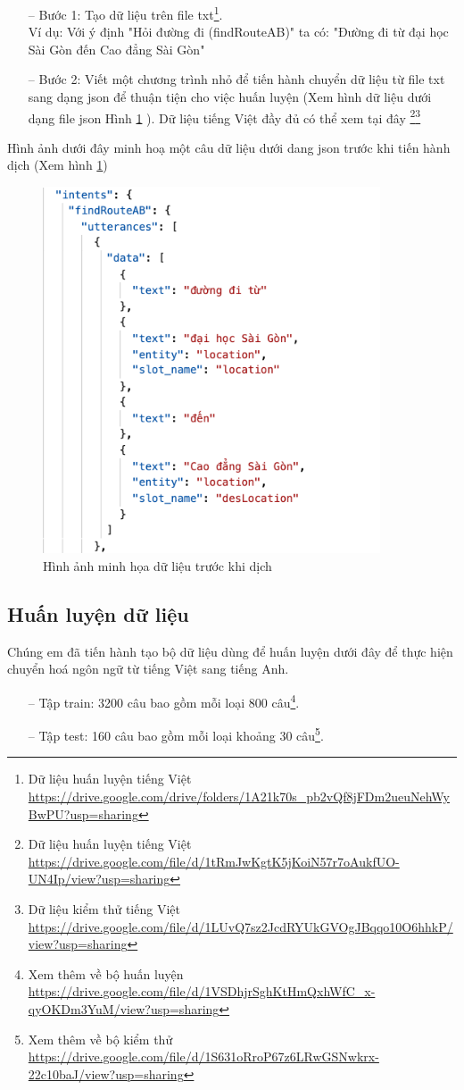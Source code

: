 \begin{itemize}
    \item[--] Bước 1: Tạo dữ liệu trên file txt\footnote{Dữ liệu huấn luyện tiếng Việt \url{https://drive.google.com/drive/folders/1A21k70s_pb2vQf8jFDm2ueuNehWyBwPU?usp=sharing}}. 
    \\Ví dụ: Với ý định "Hỏi đường đi (findRouteAB)" ta có: "Đường đi từ đại học Sài Gòn đến Cao đẳng Sài Gòn"
    \item[--] Bước 2: Viết một chương trình nhỏ để tiến hành chuyển dữ liệu từ file txt sang dạng json để thuận tiện cho việc huấn luyện (Xem hình dữ liệu dưới dạng file json Hình \ref{fig:data-train-json} ). Dữ liệu tiếng Việt đầy đủ có thể xem tại đây \footnote{Dữ liệu huấn luyện tiếng Việt \url{https://drive.google.com/file/d/1tRmJwKgtK5jKoiN57r7oAukfUO-UN4Ip/view?usp=sharing}}\footnote{Dữ liệu kiểm thử tiếng Việt \url{https://drive.google.com/file/d/1LUvQ7sz2JcdRYUkGVOgJBqqo10O6hhkP/view?usp=sharing}}
\end{itemize}
Hình ảnh dưới đây minh hoạ một câu dữ liệu dưới dang json trước khi tiến hành dịch (Xem hình \ref{fig:data-train-json})
\begin{figure}[H]
    \centering
    \includegraphics[width=10cm]{images/Data-train-json.png}
    \caption{Hình ảnh minh họa dữ liệu trước khi dịch}
    \label{fig:data-train-json}
\end{figure}
\subsection{Huấn luyện dữ liệu}
Chúng em đã tiến hành tạo bộ dữ liệu dùng để huấn luyện dưới đây để thực hiện chuyển hoá ngôn ngữ từ tiếng Việt sang tiếng Anh.
\begin{itemize}
    \item[--] Tập train: 3200 câu bao gồm mỗi loại 800 câu\footnote{Xem thêm về bộ huấn luyện \url{https://drive.google.com/file/d/1VSDhjrSghKtHmQxhWfC_x-qyOKDm3YuM/view?usp=sharing}}.
    \item[--] Tập test: 160 câu bao gồm mỗi loại khoảng 30 câu\footnote{Xem thêm về bộ kiểm thử \url{https://drive.google.com/file/d/1S631oRroP67z6LRwGSNwkrx-22c10baJ/view?usp=sharing}}.
\end{itemize}

